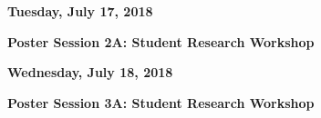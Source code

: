 
\item[] {\Large\bfseries Tuesday, July 17, 2018}\\\vspace{1.5ex}

\vspace{1ex}
\item[12:30--2:00] {\bfseries  Poster Session 2A: Student Research Workshop}
\item[$\bullet$] 
\item[$\bullet$] 
\item[$\bullet$] 
\item[$\bullet$] 
\item[$\bullet$] 
\item[$\bullet$] 
\item[$\bullet$] 
\item[$\bullet$] 
\item[$\bullet$] 
\item[$\bullet$] 
\item[$\bullet$] 

\vspace{7em}
\item[] {\Large\bfseries Wednesday, July 18, 2018}\\\vspace{1.5ex}

\vspace{1ex}
\item[12:30--2:00] {\bfseries  Poster Session 3A: Student Research Workshop}
\item[$\bullet$] 
\item[$\bullet$] 
\item[$\bullet$] 
\item[$\bullet$] 
\item[$\bullet$] 
\item[$\bullet$] 
\item[$\bullet$] 
\item[$\bullet$] 
\item[$\bullet$] 
\item[$\bullet$] 
\item[$\bullet$] 
